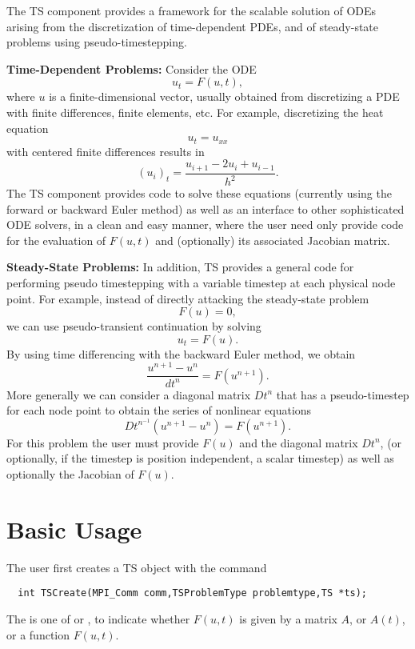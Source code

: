 The TS component provides a framework for the scalable solution of ODEs
arising from the discretization of time-dependent PDEs, and of
steady-state problems using pseudo-timestepping.

\vspace{.2cm}

\noindent
{\bf Time-Dependent Problems:} Consider the ODE
\[
              u_t = F(u,t),
\]
where $ u $ is a finite-dimensional vector, usually obtained from
discretizing a PDE with finite differences, finite elements, etc.
For example, discretizing the heat equation 
\[
          u_t = u_{xx} 
\]
with centered finite differences results in 
\[
          (u_i)_t = \frac{u_{i+1} - 2 u_{i} + u_{i-1}}{h^2}.
\]
The TS component provides code to solve these equations (currently 
using the forward or backward Euler method) as well as an interface to 
other sophisticated ODE solvers, in a clean and easy manner,
where the user need only provide code for the evaluation of $ F(u,t) $ and 
(optionally) its associated Jacobian matrix.

\vspace{.2cm}

\noindent
{\bf Steady-State Problems:} 
In addition, TS provides a general code for performing pseudo timestepping
with a variable timestep at each physical node point. For example, instead of
directly attacking the steady-state problem
\[
           F(u) = 0,
\]
we can use pseudo-transient continuation by solving
\[
           u_t = F(u).
\]
By using time differencing with the backward Euler method, we obtain
\[
           \frac{u^{n+1} - u^{n}}{dt^{n}} = F(u^{n+1}).
\]
More generally we can consider a diagonal matrix $ Dt^{n} $ that has a
pseudo-timestep for each node point to obtain the series of nonlinear equations
\[
        Dt^{n^{-1}}(u^{n+1} - u^{n}) =  F(u^{n+1}).
\]
For this problem the user must provide $ F(u) $ and the diagonal 
matrix $ Dt^{n} $, (or optionally, if the timestep is position independent,
a scalar timestep) as well as optionally the Jacobian of $ F(u).$ 

\section{Basic Usage}

The user first creates a TS object with the command
\begin{verbatim}
  int TSCreate(MPI_Comm comm,TSProblemType problemtype,TS *ts);
\end{verbatim}
 The  
is one of  or ,
to indicate whether $ F(u,t) $ is given by a matrix $ A $, or $ A(t) $, or a
function $ F(u,t). $

